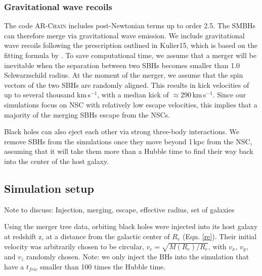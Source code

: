 \documentclass[english, apj]{emulateapj}
\begin{document}
\subsubsection{Gravitational wave recoils}
The code \textsc{AR-Chain} includes post-Newtonian terms up to order 2.5. The SMBHs can therefore merge via gravitational wave emission. We include gravitational wave recoils following the prescription outlined in Kulier15, which is based on the fitting formula by \citet{2012PhRvD..85h4015L}. To save computational time, we assume that a merger will be inevitable when the separation between two SBHs becomes smaller than 1.0 Schwarzschild radius. At the moment of the merger, we assume that the spin vectors of the two SBHs are randomly aligned. This results in kick velocities of up to several thousand km\,s$^{-1}$, with a median kick of $\approx 290$\,km\,s$^{-1}$. Since our simulations focus on NSC with relatively low escape velocities, this implies that a majority of the merging SBHs escape from the NSCs. 

Black holes can also eject each other via strong three-body interactions. We remove SBHs from the simulations once they move beyond 1\,kpc from the NSC, assuming that it will take them more than a Hubble time to find their way back into the center of the host galaxy.

\subsection{Simulation setup}
Note to discuss:  Injection, merging, escape, effective radius, set of galaxies

Using the merger tree data, orbiting black holes were injected into its host galaxy at redshift z, at a distance from the galactic center of $R_{e}$ (Eqn. \ref{re}).  Their initial velocity was arbitrarily chosen to be circular, $v_c = \sqrt{M(R_e)/R_e}$, with $v_x$, $v_y$, and $v_z$ randomly chosen.  Note: we only inject the BHs into the simulation that have a $t_{fric}$ smaller than 100 times the Hubble time.
\end{document}
